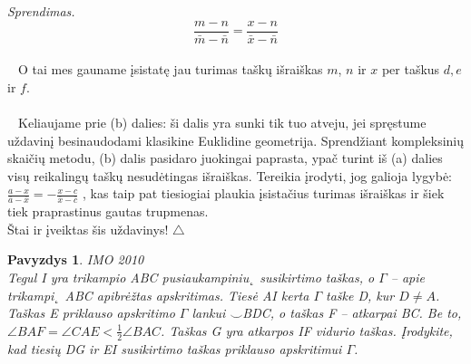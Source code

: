 \documentclass[11pt,a4paper,twoside]{book}
\newenvironment{sprendimas}{\noindent \textit{Sprendimas.}}{\hfill $\triangle$}
\newcounter{foo}[subsection]
\newtheorem{pavnr}[foo]{Pavyzdys}
\theoremstyle{definition} \newtheorem*{api}{Apibrėžimas}
\theoremstyle{remark} \newtheorem*{pastaba}{Pastaba}
\begin{document}
\begin{sprendimas}
          $$ \frac{m-n}{\bar{m}-\bar{n}}=\frac{x-n}{\bar{x} - \bar{n}}$$
\\$\phantom{a}$ O tai mes gauname įsistatę jau turimas taškų išraiškas $m$, $n$ ir $x$ per taškus $d, e$ ir $f$.
\\
\\$\phantom{a}$ Keliaujame prie (b) dalies: ši dalis yra sunki tik tuo atveju, jei spręstume uždavinį
besinaudodami klasikine Euklidine geometrija. Sprendžiant kompleksinių skaičių metodu, (b) dalis pasidaro
juokingai paprasta, ypač turint iš (a) dalies visų reikalingų taškų nesudėtingas išraiškas. Tereikia įrodyti, jog
galioja lygybė: 
 $\frac{a-x}{\bar{a}-\bar{x}}= - \frac{x-c}{\bar{x} - \bar{c}}$ , kas taip pat tiesiogiai plaukia įsistačius turimas išraiškas ir šiek tiek praprastinus gautas trupmenas.
\\ Štai ir įveiktas šis uždavinys!
\end{sprendimas}

\begin{pavnr}
IMO 2010
\\
Tegul I yra trikampio ABC pusiaukampiniu˛ susikirtimo taškas, o $\Gamma$ – apie trikampi˛
ABC apibrėžtas apskritimas. Tiesė AI kerta $\Gamma$ taške D, kur $D\ne A$. Taškas E priklauso apskritimo
$\Gamma$ lankui $\smile$BDC, o taškas F – atkarpai BC. Be to,
$\angle BAF = \angle CAE < \tfrac{1}{2}\angle BAC$.
Taškas G yra atkarpos IF vidurio taškas. Įrodykite, kad tiesių DG ir EI susikirtimo taškas priklauso
apskritimui $\Gamma$.
\end{pavnr}
\end{document}
